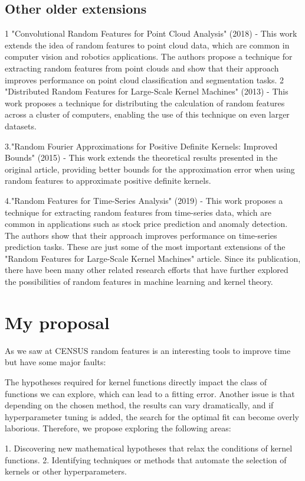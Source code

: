 \subsection*{Other older extensions}

1 "Convolutional Random Features for Point Cloud Analysis" (2018) - This work extends the idea of random features to point cloud data, which are common in computer vision and robotics applications. The authors propose a technique for extracting random features from point clouds and show that their approach improves performance on point cloud classification and segmentation tasks.
2 "Distributed Random Features for Large-Scale Kernel Machines" (2013) - This work proposes a technique for distributing the calculation of random features across a cluster of computers, enabling the use of this technique on even larger datasets.

3."Random Fourier Approximations for Positive Definite Kernels: Improved Bounds" (2015) - This work extends the theoretical results presented in the original article, providing better bounds for the approximation error when using random features to approximate positive definite kernels.

4."Random Features for Time-Series Analysis" (2019) - This work proposes a technique for extracting random features from time-series data, which are common in applications such as stock price prediction and anomaly detection. The authors show that their approach improves performance on time-series prediction tasks.
These are just some of the most important extensions of the "Random Features for Large-Scale Kernel Machines" article. Since its publication, there have been many other related research efforts that have further explored the possibilities of random features in machine learning and kernel theory.

\section{My proposal}

As we saw at CENSUS random features is an interesting tools to improve time but have some major faults: 

The hypotheses required for kernel functions directly impact the class of functions we can explore, which can lead to a fitting error. Another issue is that depending on the chosen method, the results can vary dramatically, and if hyperparameter tuning is added, the search for the optimal fit can become overly laborious. Therefore, we propose exploring the following areas:

1.  Discovering new mathematical hypotheses that relax the conditions of kernel functions.
2. Identifying techniques or methods that automate the selection of kernels or other hyperparameters.



